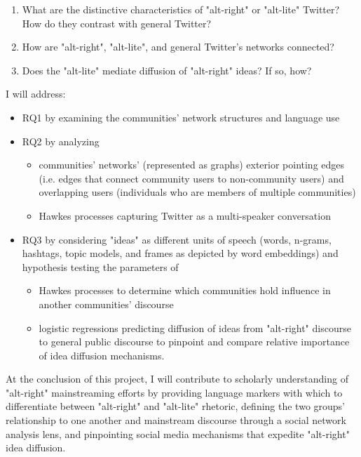 \documentclass[acmlarge, screen, authorversion]{acmart}
\begin{document}
\begin{enumerate}[font={\bfseries},label={{RQ}\arabic*.}]
	\item What are the distinctive characteristics of "alt-right" or "alt-lite"
  Twitter? How do they contrast with general Twitter?

	\item How are "alt-right", "alt-lite", and general Twitter's networks
  connected?

	\item Does the "alt-lite" mediate diffusion of "alt-right" ideas? If so, how?
\end{enumerate}

I will address:
\begin{itemize}
	\item RQ1 by examining the communities’ network structures and language use
	\item RQ2 by analyzing
	      \begin{itemize}
	      	\item communities’ networks’ (represented as graphs) exterior pointing edges
	      	      (i.e. edges that connect community users to non-community users) and
	      	      overlapping users (individuals who are members of multiple communities)
	      	\item Hawkes processes capturing Twitter as a multi-speaker
	      	      conversation
	      \end{itemize}
	\item RQ3 by considering "ideas" as different units of speech (words, n-grams, hashtags, topic models, and frames as depicted by word embeddings) and hypothesis testing the parameters of
	      \begin{itemize}
	      	\item Hawkes
	      	      processes to determine which communities hold influence in another
	      	      communities’ discourse
	      	\item logistic regressions predicting diffusion of ideas from
	      	      "alt-right" discourse to general public discourse to pinpoint and compare relative importance of idea diffusion mechanisms.
	      \end{itemize}
\end{itemize}

At the conclusion of this project, I will contribute to scholarly understanding of "alt-right"
mainstreaming efforts by providing language markers with which to differentiate between
"alt-right" and "alt-lite" rhetoric, defining the two groups' relationship to one another and
mainstream discourse through a social network analysis lens, and pinpointing social media mechanisms
that expedite "alt-right" idea diffusion.
\end{document}
